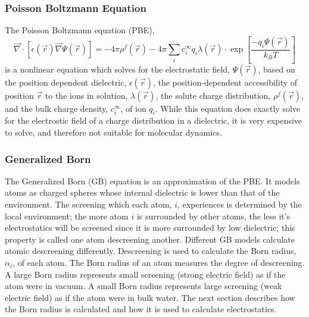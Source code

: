 \subsubsection{Poisson Boltzmann Equation}
The Poisson Boltzmann equation (PBE),
$$
\vec{\nabla} \cdot \left[ \epsilon (\vec{r}) \vec{\nabla} \Psi(\vec{r})  \right] = -4\pi \rho^f (\vec{r}) - 4 \pi \sum_i c_i^\infty q_i \lambda(\vec{r}) \cdot \exp \left[ \frac{-q_i \Psi(\vec{r})}{k_B T} \right]
$$
is a nonlinear equation which solves for the electrostatic field, $\Psi(\vec{r})$, based on
the position dependent dielectric, $\epsilon(\vec{r})$,
the position-dependent accessibility of position $\vec{r}$ to the ions in solution, $\lambda(\vec{r})$,
the solute charge distribution, $\rho^f(\vec{r})$,
and the bulk charge density, $c_i^\infty$, of ion $q_i$.
While this equation does exactly solve for the electrostic field of a charge distribution in a dielectric, it is very expensive to solve, and therefore not suitable for molecular dynamics.


\subsubsection{Generalized Born}
The Generalized Born (GB) equation is an approximation of the PBE.
It models atoms as charged spheres whose internal dielectric is lower than that of the environment.
The screening which each atom, $i$, experiences is determined by the local environment;
the more atom $i$ is surrounded by other atoms, the less it's electrostatics will be screened since it is more surrounded by low dielectric; this property is called one atom descreening another.
Different GB models calculate atomic descreening differently.
Descreening is used to calculate the Born radius, $\alpha_i$, of each atom.
The Born radius of an atom measures the degree of descreening.
A large Born radius represents small screening (strong electric field) as if the atom were in vacuum.
A small Born radius represents large screening (weak electric field) as if the atom were in bulk water.
The next section describes how the Born radius is calculated and how it is used to calculate electrostatics.

